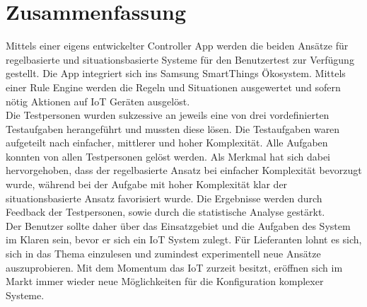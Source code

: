 \section{Zusammenfassung}
Mittels einer eigens entwickelter Controller App werden die beiden Ansätze für regelbasierte und situationsbasierte Systeme für den Benutzertest zur Verfügung gestellt. Die App integriert sich ins Samsung SmartThings Ökosystem. Mittels einer Rule Engine werden die Regeln und Situationen ausgewertet und sofern nötig Aktionen auf IoT Geräten ausgelöst.\\[2ex]
%
Die Testpersonen wurden sukzessive an jeweils eine von drei vordefinierten Testaufgaben herangeführt und mussten diese lösen. Die Testaufgaben waren aufgeteilt nach einfacher, mittlerer und hoher Komplexität. Alle Aufgaben konnten von allen Testpersonen gelöst werden. Als Merkmal hat sich dabei hervorgehoben, dass der regelbasierte Ansatz bei einfacher Komplexität bevorzugt wurde, während bei der Aufgabe mit hoher Komplexität klar der situationsbasierte Ansatz favorisiert wurde. Die Ergebnisse werden durch Feedback der Testpersonen, sowie durch die statistische Analyse gestärkt.\\[2ex]
%
Der Benutzer sollte daher über das Einsatzgebiet und die Aufgaben des System im Klaren sein, bevor er sich ein IoT System zulegt. Für Lieferanten lohnt es sich, sich in das Thema einzulesen und zumindest experimentell neue Ansätze auszuprobieren. Mit dem Momentum das IoT zurzeit besitzt, eröffnen sich im Markt immer wieder neue Möglichkeiten für die Konfiguration komplexer Systeme.